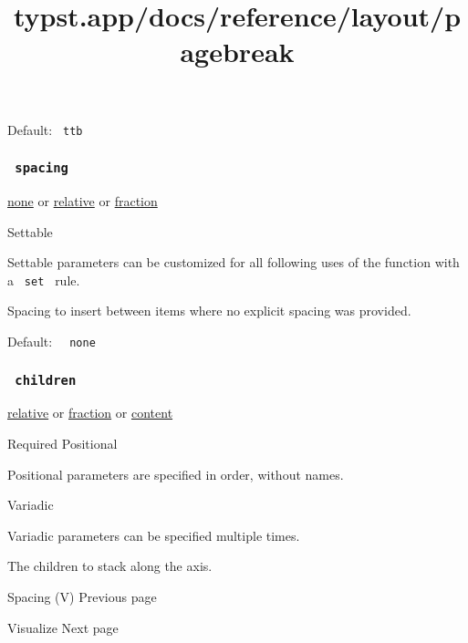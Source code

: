 Default: \texttt{\ ttb\ }

\subsubsection{\texorpdfstring{\texttt{\ spacing\ }}{ spacing }}\label{parameters-spacing}

\href{/docs/reference/foundations/none/}{none} {or}
\href{/docs/reference/layout/relative/}{relative} {or}
\href{/docs/reference/layout/fraction/}{fraction}

{{ Settable }}

\label{parameters-spacing-settable-tooltip}
Settable parameters can be customized for all following uses of the
function with a \texttt{\ set\ } rule.

Spacing to insert between items where no explicit spacing was provided.

Default: \texttt{\ }{\texttt{\ none\ }}\texttt{\ }

\subsubsection{\texorpdfstring{\texttt{\ children\ }}{ children }}\label{parameters-children}

\href{/docs/reference/layout/relative/}{relative} {or}
\href{/docs/reference/layout/fraction/}{fraction} {or}
\href{/docs/reference/foundations/content/}{content}

{Required} {{ Positional }}

\label{parameters-children-positional-tooltip}
Positional parameters are specified in order, without names.

{{ Variadic }}

\label{parameters-children-variadic-tooltip}
Variadic parameters can be specified multiple times.

The children to stack along the axis.

\href{/docs/reference/layout/v/}{\pandocbounded{}}

{ Spacing (V) } { Previous page }

\href{/docs/reference/visualize/}{\pandocbounded{}}

{ Visualize } { Next page }


\title{typst.app/docs/reference/layout/pagebreak}

